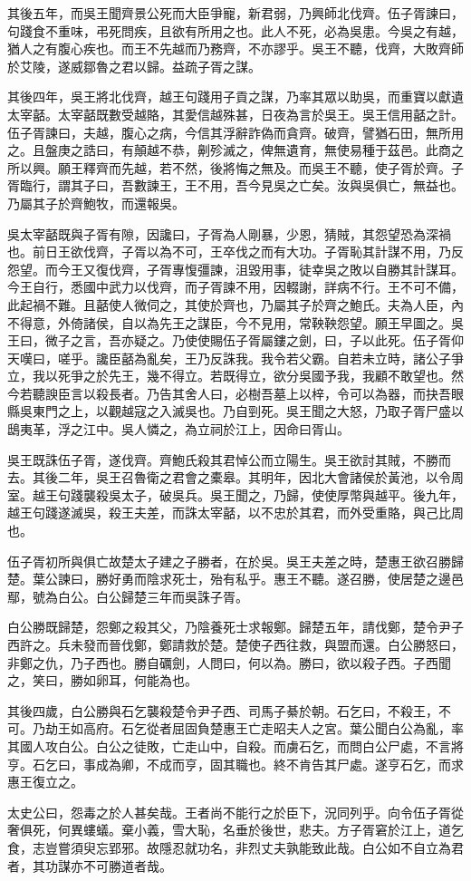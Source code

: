 其後五年，而吳王聞齊景公死而大臣爭寵，新君弱，乃興師北伐齊。伍子胥諫曰，句踐食不重味，弔死問疾，且欲有所用之也。此人不死，必為吳患。今吳之有越，猶人之有腹心疾也。而王不先越而乃務齊，不亦謬乎。吳王不聽，伐齊，大敗齊師於艾陵，遂威鄒魯之君以歸。益疏子胥之謀。

其後四年，吳王將北伐齊，越王句踐用子貢之謀，乃率其眾以助吳，而重寶以獻遺太宰嚭。太宰嚭既數受越賂，其愛信越殊甚，日夜為言於吳王。吳王信用嚭之計。伍子胥諫曰，夫越，腹心之病，今信其浮辭詐偽而貪齊。破齊，譬猶石田，無所用之。且盤庚之誥曰，有顛越不恭，劓殄滅之，俾無遺育，無使易種于茲邑。此商之所以興。願王釋齊而先越，若不然，後將悔之無及。而吳王不聽，使子胥於齊。子胥臨行，謂其子曰，吾數諫王，王不用，吾今見吳之亡矣。汝與吳俱亡，無益也。乃屬其子於齊鮑牧，而還報吳。

吳太宰嚭既與子胥有隙，因讒曰，子胥為人剛暴，少恩，猜賊，其怨望恐為深禍也。前日王欲伐齊，子胥以為不可，王卒伐之而有大功。子胥恥其計謀不用，乃反怨望。而今王又復伐齊，子胥專愎彊諫，沮毀用事，徒幸吳之敗以自勝其計謀耳。今王自行，悉國中武力以伐齊，而子胥諫不用，因輟謝，詳病不行。王不可不備，此起禍不難。且嚭使人微伺之，其使於齊也，乃屬其子於齊之鮑氏。夫為人臣，內不得意，外倚諸侯，自以為先王之謀臣，今不見用，常鞅鞅怨望。願王早圖之。吳王曰，微子之言，吾亦疑之。乃使使賜伍子胥屬鏤之劍，曰，子以此死。伍子胥仰天嘆曰，嗟乎。讒臣嚭為亂矣，王乃反誅我。我令若父霸。自若未立時，諸公子爭立，我以死爭之於先王，幾不得立。若既得立，欲分吳國予我，我顧不敢望也。然今若聽諛臣言以殺長者。乃告其舍人曰，必樹吾墓上以梓，令可以為器，而抉吾眼縣吳東門之上，以觀越寇之入滅吳也。乃自剄死。吳王聞之大怒，乃取子胥尸盛以鴟夷革，浮之江中。吳人憐之，為立祠於江上，因命曰胥山。

吳王既誅伍子胥，遂伐齊。齊鮑氏殺其君悼公而立陽生。吳王欲討其賊，不勝而去。其後二年，吳王召魯衛之君會之橐皋。其明年，因北大會諸侯於黃池，以令周室。越王句踐襲殺吳太子，破吳兵。吳王聞之，乃歸，使使厚幣與越平。後九年，越王句踐遂滅吳，殺王夫差，而誅太宰嚭，以不忠於其君，而外受重賂，與己比周也。

伍子胥初所與俱亡故楚太子建之子勝者，在於吳。吳王夫差之時，楚惠王欲召勝歸楚。葉公諫曰，勝好勇而陰求死士，殆有私乎。惠王不聽。遂召勝，使居楚之邊邑鄢，號為白公。白公歸楚三年而吳誅子胥。

白公勝既歸楚，怨鄭之殺其父，乃陰養死士求報鄭。歸楚五年，請伐鄭，楚令尹子西許之。兵未發而晉伐鄭，鄭請救於楚。楚使子西往救，與盟而還。白公勝怒曰，非鄭之仇，乃子西也。勝自礪劍，人問曰，何以為。勝曰，欲以殺子西。子西聞之，笑曰，勝如卵耳，何能為也。

其後四歲，白公勝與石乞襲殺楚令尹子西、司馬子綦於朝。石乞曰，不殺王，不可。乃劫王如高府。石乞從者屈固負楚惠王亡走昭夫人之宮。葉公聞白公為亂，率其國人攻白公。白公之徒敗，亡走山中，自殺。而虜石乞，而問白公尸處，不言將亨。石乞曰，事成為卿，不成而亨，固其職也。終不肯告其尸處。遂亨石乞，而求惠王復立之。

太史公曰，怨毒之於人甚矣哉。王者尚不能行之於臣下，況同列乎。向令伍子胥從奢俱死，何異螻蟻。棄小義，雪大恥，名垂於後世，悲夫。方子胥窘於江上，道乞食，志豈嘗須臾忘郢邪。故隱忍就功名，非烈丈夫孰能致此哉。白公如不自立為君者，其功謀亦不可勝道者哉。